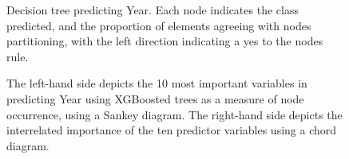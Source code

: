 \documentclass[review,12pt,authoryear]{elsarticle}
\begin{document}
\begin{linenumbers}
 \begin{figure}
  \caption{Decision tree predicting Year. Each node indicates the class predicted, and the proportion of elements agreeing with nodes partitioning, with the left direction indicating a yes to the nodes rule.}\label{fig:year_tree}
 \end{figure}
 
 \begin{figure}
  \caption{The left-hand side depicts the 10 most important variables in predicting Year using XGBoosted trees as a measure of node occurrence, using a Sankey diagram. The right-hand side depicts the interrelated importance of the ten predictor variables using a chord diagram.}\label{fig:year_sankey}
 \end{figure}
 

\end{linenumbers}
 
\end{document}
